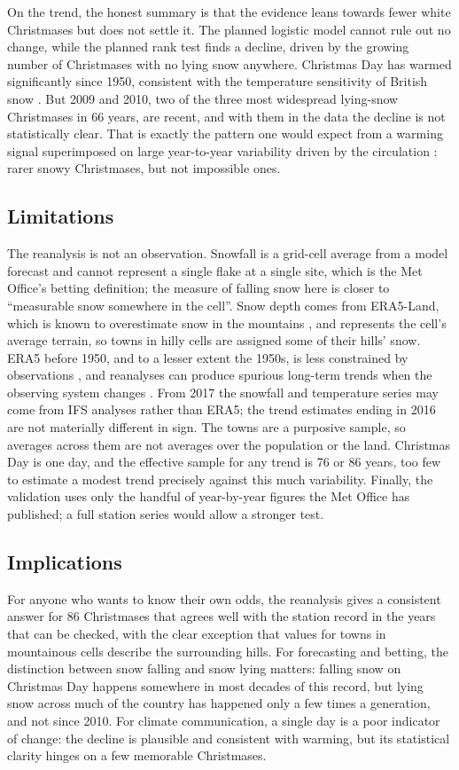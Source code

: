\documentclass[11pt,a4paper]{article}
\begin{document}
On the trend, the honest summary is that the evidence leans towards fewer white Christmases but does not settle it. The planned logistic model cannot rule out no change, while the planned rank test finds a decline, driven by the growing number of Christmases with no lying snow anywhere. Christmas Day has warmed significantly since 1950, consistent with the temperature sensitivity of British snow \citep{brown2019,brown2020}. But 2009 and 2010, two of the three most widespread lying-snow Christmases in 66 years, are recent, and with them in the data the decline is not statistically clear. That is exactly the pattern one would expect from a warming signal superimposed on large year-to-year variability driven by the circulation \citep{brown2020}: rarer snowy Christmases, but not impossible ones.

\subsection{Limitations}
The reanalysis is not an observation. Snowfall is a grid-cell average from a model forecast and cannot represent a single flake at a single site, which is the Met Office's betting definition; the measure of falling snow here is closer to ``measurable snow somewhere in the cell''. Snow depth comes from ERA5-Land, which is known to overestimate snow in the mountains \citep{kouki2023,monteiro2023}, and represents the cell's average terrain, so towns in hilly cells are assigned some of their hills' snow. ERA5 before 1950, and to a lesser extent the 1950s, is less constrained by observations \citep{bell2021}, and reanalyses can produce spurious long-term trends when the observing system changes \citep{monteiro2023}. From 2017 the snowfall and temperature series may come from IFS analyses rather than ERA5; the trend estimates ending in 2016 are not materially different in sign. The towns are a purposive sample, so averages across them are not averages over the population or the land. Christmas Day is one day, and the effective sample for any trend is 76 or 86 years, too few to estimate a modest trend precisely against this much variability. Finally, the validation uses only the handful of year-by-year figures the Met Office has published; a full station series would allow a stronger test.

\subsection{Implications}
For anyone who wants to know their own odds, the reanalysis gives a consistent answer for 86 Christmases that agrees well with the station record in the years that can be checked, with the clear exception that values for towns in mountainous cells describe the surrounding hills. For forecasting and betting, the distinction between snow falling and snow lying matters: falling snow on Christmas Day happens somewhere in most decades of this record, but lying snow across much of the country has happened only a few times a generation, and not since 2010. For climate communication, a single day is a poor indicator of change: the decline is plausible and consistent with warming, but its statistical clarity hinges on a few memorable Christmases.
\end{document}
